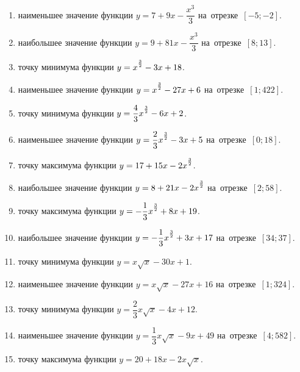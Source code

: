 \documentclass[a4paper,10pt]{article}
\begin{document}
\begin{enumerate}
\item {} наименьшее значение функции $y=7 +9x-\dfrac{x^3}{3}$ на~отрезке~$\left[-5;-2\right]$.

\item {} наибольшее значение функции $y=9 +81x-\dfrac{x^3}{3}$ на~отрезке~$\left[8;13\right]$.

\item {} точку минимума функции $y=x\strut^{\frac{3}{2}} -3x+18$.

\item {} наименьшее значение функции $y=x\strut^{\frac{3}{2}} -27x+6$ на~отрезке~$\left[1;422\right]$.

\item {} точку минимума функции $y=\dfrac{4}{3}x\strut^{\frac{3}{2}} -6x+2$.

\item {} наименьшее значение функции $y=\dfrac{2}{3}x\strut^{\frac{3}{2}} -3x+5$ на~отрезке~$\left[0;18\right]$.

\item {} точку максимума функции $y=17+15x-2x\strut^{\frac{3}{2}}$.

\item {} наибольшее значение функции $y=8+21x-2x\strut^{\frac{3}{2}}$ на~отрезке~$\left[2;58\right]$.

\item {} точку максимума функции $y=-\dfrac{1}{3}x\strut^{\frac{3}{2}} +8x+19$.

\item {} наибольшее значение функции $y=-\dfrac{1}{3}x\strut^{\frac{3}{2}} +3x+17$ на~отрезке~$\left[34;37\right]$.

\item {} точку минимума функции $y=x\sqrt{x} -30x+1$.

\item {} наименьшее значение функции $y=x\sqrt{x} -27x+16$ на~отрезке~$\left[1;324\right]$.

\item {} точку минимума функции $y=\dfrac{2}{3}x\sqrt{x} -4x+12$.

\item {} наименьшее значение функции $y=\dfrac{1}{3}x\sqrt{x} -9x+49$ на~отрезке~$\left[4;582\right]$.

\item {} точку максимума функции $y=20+18x -2x\sqrt{x}$.


\end{enumerate}
\end{document}

